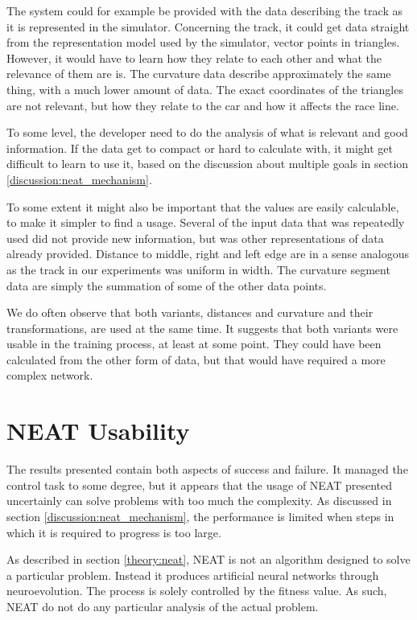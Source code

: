 The system could for example be provided with the data describing the track as it is represented in the simulator. 
Concerning the track, it could get data straight from the representation model used by the simulator, vector points in triangles. However, it would have to learn how they relate to each other and what the relevance of them are is. The curvature data describe approximately the same thing, with a much lower amount of data. The exact coordinates of the triangles are not relevant, but how they relate to the car and how it affects the race line. 

To some level, the developer need to do the analysis of what is relevant and good information. If the data get to compact or hard to calculate with, it might get difficult to learn to use it, based on the discussion about multiple goals in section \ref{discussion:neat_mechanism}.

To some extent it might also be important that the values are easily calculable, to make it simpler to find a usage. Several of the input data that was repeatedly used did not provide new information, but was other representations of data already provided. Distance to middle, right and left edge are in a sense analogous as the track in our experiments was uniform in width. The curvature segment data are simply the summation of some of the other data points.

We do often observe that both variants, distances and curvature and their transformations, are used at the same time. It suggests that both variants were usable in the training process, at least at some point. They could have been calculated from the other form of data, but that would have required a more complex network.

\section{NEAT Usability}

The results presented contain both aspects of success and failure. It managed the control task to some degree, but it appears that the usage of NEAT presented uncertainly can solve problems with too much the complexity. As discussed in section \ref{discussion:neat_mechanism}, the performance is limited when steps in which it is required to progress is too large.

As described in section \ref{theory:neat}, NEAT is not an algorithm designed to solve a particular problem. Instead it produces artificial neural networks through neuroevolution. The process is solely controlled by the fitness value. As such, NEAT do not do any particular analysis of the actual problem. 

